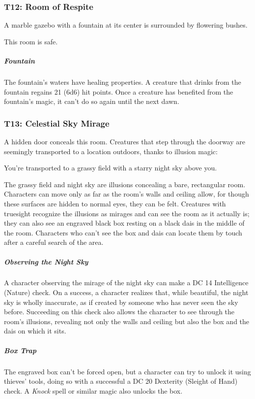 \documentclass[10pt,a4paper,twoside,bg=print,twocolumn,openany,nodeprecatedcode]{dndbook}
\begin{document}
\subsubsection{T12: Room of Respite}
\begin{DndReadAloud}{}
A marble gazebo with a fountain at its center is surrounded by flowering bushes.

\end{DndReadAloud}

This room is safe.

\subparagraph{Fountain}
The fountain's waters have healing properties. A creature that drinks from the fountain regains 21 (6d6) hit points. Once a creature has benefited from the fountain's magic, it can't do so again until the next dawn.

\subsubsection{T13: Celestial Sky Mirage}
A hidden door conceals this room. Creatures that step through the doorway are seemingly transported to a location outdoors, thanks to illusion magic:

\begin{DndReadAloud}{}
You're transported to a grassy field with a starry night sky above you.

\end{DndReadAloud}

The grassy field and night sky are illusions concealing a bare, rectangular room. Characters can move only as far as the room's walls and ceiling allow, for though these surfaces are hidden to normal eyes, they can be felt. Creatures with truesight recognize the illusions as mirages and can see the room as it actually is; they can also see an engraved black box resting on a black dais in the middle of the room. Characters who can't see the box and dais can locate them by touch after a careful search of the area.

\subparagraph{Observing the Night Sky}
A character observing the mirage of the night sky can make a DC 14 Intelligence (Nature) check. On a success, a character realizes that, while beautiful, the night sky is wholly inaccurate, as if created by someone who has never seen the sky before. Succeeding on this check also allows the character to see through the room's illusions, revealing not only the walls and ceiling but also the box and the dais on which it sits.

\subparagraph{Box Trap}
The engraved box can't be forced open, but a character can try to unlock it using thieves' tools, doing so with a successful a DC 20 Dexterity (Sleight of Hand) check. A \textit{Knock} spell or similar magic also unlocks the box.
\end{document}
